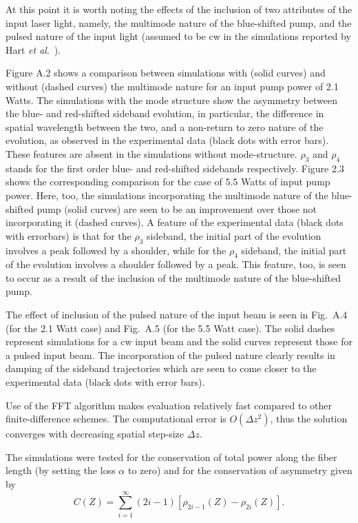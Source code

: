 At this point it is worth noting the effects of the inclusion of two attributes of
the input laser light, namely, the multimode nature of the blue-shifted pump, and
the pulsed nature of the input light (assumed to be cw in the simulations reported by
Hart {\it et al}.\ \cite{hart1}).

Figure A.2 shows a comparison between simulations with (solid curves) and without (dashed curves) the multimode nature for an input pump power of 2.1 Watts. The simulations with the mode structure show the asymmetry between the blue- and red-shifted sideband evolution, in particular, the difference in spatial wavelength between the two, and a non-return to zero nature of the evolution, as observed in the experimental data (black dots with error bars). These features are absent in the simulations without mode-structure. $\rho_3$ and $\rho_4$ stands for the first order blue- and red-shifted sidebands respectively.  Figure 2.3 shows the corresponding comparison for the case of 5.5 Watts of input pump power.  Here, too, the simulations incorporating the multimode nature of the blue-shifted pump (solid curves) are seen to be an improvement over those not incorporating it (dashed curves). A feature of the experimental data (black dots with errorbars) is that for the $\rho_3$ sideband, the initial part of the evolution involves a peak followed by a shoulder, while for the $\rho_4$ sideband, the initial part of the evolution involves a shoulder followed by a peak. This feature, too, is seen to occur as a result of the inclusion of the multimode nature of the blue-shifted pump.

The effect of inclusion of the pulsed nature of the input beam is seen in Fig.\ A.4 (for the 2.1 Watt case) and Fig.\ A.5 (for the 5.5 Watt case). The solid dashes represent simulations for a cw input beam and the solid curves represent those for a pulsed input beam. The incorporation of the pulsed nature clearly results in damping of the sideband trajectories which are seen to come closer to the experimental data \cite{hart1} (black dots with error bars).

Use of the FFT algorithm makes evaluation relatively fast compared to other
finite-difference schemes. The computational error is $O(\Delta z^2)$, thus
the solution converges with decreasing spatial step-size $\Delta z$.

The simulations were tested for the conservation of total power along the
fiber length (by setting the loss $\alpha$ to zero) and for the conservation
of asymmetry \cite{thompson1,hart1} given by
\begin{equation}
C(Z) = \sum_{i=1}^{\infty}(2i-1)[\rho_{2i-1}(Z)-\rho_{2i}(Z)] .
\end{equation}

